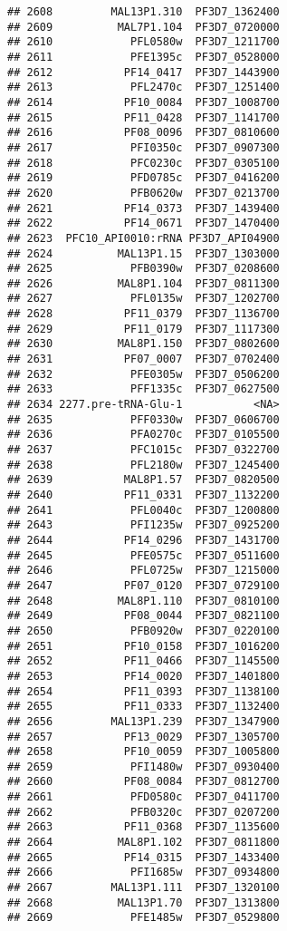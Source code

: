 \documentclass{article}\usepackage[]{graphicx}\usepackage[]{color}
\makeatletter
\newenvironment{kframe}{%
 \def\at@end@of@kframe{}%
 \ifinner\ifhmode%
  \def\at@end@of@kframe{\end{minipage}}%
  \begin{minipage}{\columnwidth}%
 \fi\fi%
 \def\FrameCommand##1{\hskip\@totalleftmargin \hskip-\fboxsep
 \colorbox{shadecolor}{##1}\hskip-\fboxsep
     \hskip-\linewidth \hskip-\@totalleftmargin \hskip\columnwidth}%
 \MakeFramed {\advance\hsize-\width
   \@totalleftmargin\z@ \linewidth\hsize
   \@setminipage}}%
 {\par\unskip\endMakeFramed%
 \at@end@of@kframe}
\newenvironment{knitrout}{}{} %
\makeatother
\begin{document}
\begin{knitrout}
\begin{kframe}
\begin{verbatim}
## 2608         MAL13P1.310  PF3D7_1362400
## 2609          MAL7P1.104  PF3D7_0720000
## 2610            PFL0580w  PF3D7_1211700
## 2611            PFE1395c  PF3D7_0528000
## 2612           PF14_0417  PF3D7_1443900
## 2613            PFL2470c  PF3D7_1251400
## 2614           PF10_0084  PF3D7_1008700
## 2615           PF11_0428  PF3D7_1141700
## 2616           PF08_0096  PF3D7_0810600
## 2617            PFI0350c  PF3D7_0907300
## 2618            PFC0230c  PF3D7_0305100
## 2619            PFD0785c  PF3D7_0416200
## 2620            PFB0620w  PF3D7_0213700
## 2621           PF14_0373  PF3D7_1439400
## 2622           PF14_0671  PF3D7_1470400
## 2623  PFC10_API0010:rRNA PF3D7_API04900
## 2624          MAL13P1.15  PF3D7_1303000
## 2625            PFB0390w  PF3D7_0208600
## 2626          MAL8P1.104  PF3D7_0811300
## 2627            PFL0135w  PF3D7_1202700
## 2628           PF11_0379  PF3D7_1136700
## 2629           PF11_0179  PF3D7_1117300
## 2630          MAL8P1.150  PF3D7_0802600
## 2631           PF07_0007  PF3D7_0702400
## 2632            PFE0305w  PF3D7_0506200
## 2633            PFF1335c  PF3D7_0627500
## 2634 2277.pre-tRNA-Glu-1           <NA>
## 2635            PFF0330w  PF3D7_0606700
## 2636            PFA0270c  PF3D7_0105500
## 2637            PFC1015c  PF3D7_0322700
## 2638            PFL2180w  PF3D7_1245400
## 2639           MAL8P1.57  PF3D7_0820500
## 2640           PF11_0331  PF3D7_1132200
## 2641            PFL0040c  PF3D7_1200800
## 2643            PFI1235w  PF3D7_0925200
## 2644           PF14_0296  PF3D7_1431700
## 2645            PFE0575c  PF3D7_0511600
## 2646            PFL0725w  PF3D7_1215000
## 2647           PF07_0120  PF3D7_0729100
## 2648          MAL8P1.110  PF3D7_0810100
## 2649           PF08_0044  PF3D7_0821100
## 2650            PFB0920w  PF3D7_0220100
## 2651           PF10_0158  PF3D7_1016200
## 2652           PF11_0466  PF3D7_1145500
## 2653           PF14_0020  PF3D7_1401800
## 2654           PF11_0393  PF3D7_1138100
## 2655           PF11_0333  PF3D7_1132400
## 2656         MAL13P1.239  PF3D7_1347900
## 2657           PF13_0029  PF3D7_1305700
## 2658           PF10_0059  PF3D7_1005800
## 2659            PFI1480w  PF3D7_0930400
## 2660           PF08_0084  PF3D7_0812700
## 2661            PFD0580c  PF3D7_0411700
## 2662            PFB0320c  PF3D7_0207200
## 2663           PF11_0368  PF3D7_1135600
## 2664          MAL8P1.102  PF3D7_0811800
## 2665           PF14_0315  PF3D7_1433400
## 2666            PFI1685w  PF3D7_0934800
## 2667         MAL13P1.111  PF3D7_1320100
## 2668          MAL13P1.70  PF3D7_1313800
## 2669            PFE1485w  PF3D7_0529800

\end{verbatim}
\end{kframe}
\end{knitrout}
\end{document}
